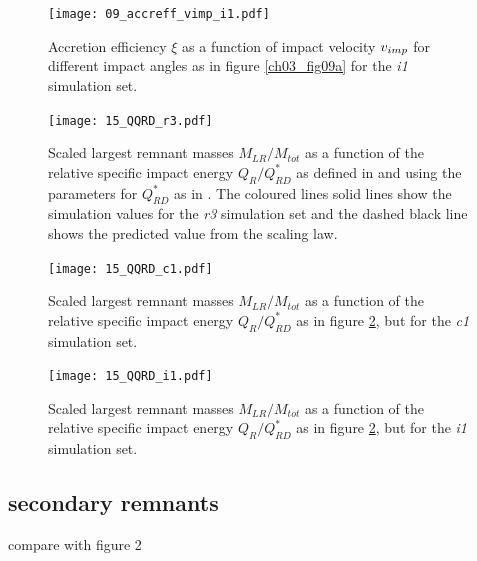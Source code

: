 \begin{landscape}
\begin{figure}[htbp]
\begin{center}
\texttt{[image: 09\_accreff\_vimp\_i1.pdf]}
\caption{Accretion efficiency $\xi$ as a function of impact velocity $v_{imp}$ for different impact angles as in figure \ref{ch03_fig09a} for the \emph{i1} simulation set.}
\label{ch03_fig09c}
\end{center}
\end{figure}

\begin{figure}[htbp]
\begin{center}
\texttt{[image: 15\_QQRD\_r3.pdf]}
\caption{Scaled largest remnant masses $M_{LR} / M_{tot}$ as a function of the relative specific impact energy $Q_R / Q^*_{RD}$ as defined in \cite{Stewart:2009p3265} and using the parameters for $Q^*_{RD}$ as in \cite{2010ApJ...712L..73M}. The coloured lines solid lines show the simulation values for the \emph{r3} simulation set and the dashed black line shows the predicted value from the scaling law.}
\label{ch03_fig15a}
\end{center}
\end{figure}

\begin{figure}[htbp]
\begin{center}
\texttt{[image: 15\_QQRD\_c1.pdf]}
\caption{Scaled largest remnant masses $M_{LR} / M_{tot}$ as a function of the relative specific impact energy $Q_R / Q^*_{RD}$ as in figure \ref{ch03_fig15a}, but for the \emph{c1} simulation set.}
\label{ch03_fig15b}
\end{center}
\end{figure}

\begin{figure}[htbp]
\begin{center}
\texttt{[image: 15\_QQRD\_i1.pdf]}
\caption{Scaled largest remnant masses $M_{LR} / M_{tot}$ as a function of the relative specific impact energy $Q_R / Q^*_{RD}$ as in figure \ref{ch03_fig15a}, but for the \emph{i1} simulation set.}
\label{ch03_fig15c}
\end{center}
\end{figure}
\end{landscape}




\subsection{secondary remnants}
\cite{Agnor:2004p3329} compare with figure 2\\

